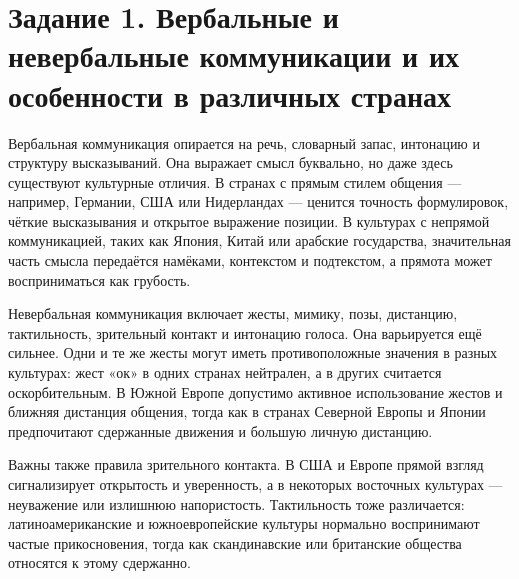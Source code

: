 \documentclass[14pt,a4paper]{extarticle}
\begin{document}
\section{Задание 1. Вербальные и невербальные коммуникации и их особенности в различных странах}
\begin{sloppypar}
Вербальная коммуникация опирается на речь, словарный запас, интонацию и
    структуру высказываний. Она выражает смысл буквально, но даже здесь
    существуют культурные отличия. В странах с прямым стилем общения —
    например, Германии, США или Нидерландах — ценится точность формулировок,
    чёткие высказывания и открытое выражение позиции. В культурах с непрямой
    коммуникацией, таких как Япония, Китай или арабские государства,
    значительная часть смысла передаётся намёками, контекстом и подтекстом, а
    прямота может восприниматься как грубость.

    Невербальная коммуникация включает жесты, мимику, позы, дистанцию,
    тактильность, зрительный контакт и интонацию голоса. Она варьируется ещё
    сильнее. Одни и те же жесты могут иметь противоположные значения в разных
    культурах: жест «ок» в одних странах нейтрален, а в других считается
    оскорбительным. В Южной Европе допустимо активное использование жестов и
    ближняя дистанция общения, тогда как в странах Северной Европы и Японии
    предпочитают сдержанные движения и большую личную дистанцию.

    Важны также правила зрительного контакта. В США и Европе прямой взгляд
    сигнализирует открытость и уверенность, а в некоторых восточных культурах —
    неуважение или излишнюю напористость. Тактильность тоже различается:
    латиноамериканские и южноевропейские культуры нормально воспринимают частые
    прикосновения, тогда как скандинавские или британские общества относятся к
    этому сдержанно.
\end{sloppypar}
\end{document}
